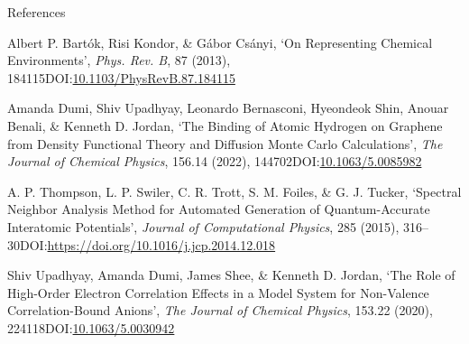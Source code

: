 \documentclass[
  letterpaper,
  DIV=11,
  numbers=noendperiod]{scrartcl}
\newlength{\cslhangindent}
\newlength{\cslentryspacingunit} %
\newenvironment{CSLReferences}[2] %
 {%
  \setlength{\parindent}{0pt}
  \ifodd #1
  \let\oldpar\par
  \def\par{\hangindent=\cslhangindent\oldpar}
  \fi
  \setlength{\parskip}{#2\cslentryspacingunit}
 }%
 {}
\begin{document}
References

\hypertarget{refs}{}
\begin{CSLReferences}{1}{0}
\leavevmode{}%
Albert P. Bartók, Risi Kondor, \& Gábor Csányi, {`On Representing
Chemical Environments'}, \emph{Phys. Rev. B}, 87 (2013),
184115DOI:\href{https://doi.org/10.1103/PhysRevB.87.184115}{10.1103/PhysRevB.87.184115}

\leavevmode{}%
Amanda Dumi, Shiv Upadhyay, Leonardo Bernasconi, Hyeondeok Shin, Anouar
Benali, \& Kenneth D. Jordan, {`The Binding of Atomic Hydrogen on
Graphene from Density Functional Theory and Diffusion Monte Carlo
Calculations'}, \emph{The Journal of Chemical Physics}, 156.14 (2022),
144702DOI:\href{https://doi.org/10.1063/5.0085982}{10.1063/5.0085982}

\leavevmode{}%
A. P. Thompson, L. P. Swiler, C. R. Trott, S. M. Foiles, \& G. J.
Tucker, {`Spectral Neighbor Analysis Method for Automated Generation of
Quantum-Accurate Interatomic Potentials'}, \emph{Journal of
Computational Physics}, 285 (2015),
316--30DOI:\url{https://doi.org/10.1016/j.jcp.2014.12.018}

\leavevmode{}%
Shiv Upadhyay, Amanda Dumi, James Shee, \& Kenneth D. Jordan, {`The Role
of High-Order Electron Correlation Effects in a Model System for
Non-Valence Correlation-Bound Anions'}, \emph{The Journal of Chemical
Physics}, 153.22 (2020),
224118DOI:\href{https://doi.org/10.1063/5.0030942}{10.1063/5.0030942}

\end{CSLReferences}
\end{document}
